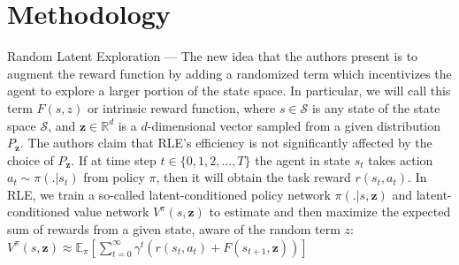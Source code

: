 \documentclass[10pt]{article} %
\begin{document}
\section{Methodology}
Random Latent Exploration --- The new idea that the authors \cite{rle-paper} present is to augment the reward function by adding a randomized term which incentivizes the agent to explore a larger portion of the state space. In particular, we will call this term $F(s, z)$ or intrinsic reward function, where $s \in \mathcal{S}$ is any state of the state space $\mathcal{S}$, and $\textbf{z} \in \mathbb{R}^{d}$ is a $d$-dimensional vector sampled from a given distribution $P_{\textbf{z}}$. The authors \cite{rle-paper} claim that RLE's efficiency is not significantly affected by the choice of $P_{\textbf{z}}$. If at time step $t \in \{0, 1, 2, ..., T\}$ the agent in state $s_{t}$ takes action $a_{t} \sim \pi(. | s_{t})$ from policy $\pi$, then it will obtain the task reward $r (s_{t}, a_{t})$. In RLE, we train a so-called latent-conditioned policy network $\pi(. | s, \textbf{z})$ and latent-conditioned value network $V^{\pi}(s, \textbf{z})$ to estimate and then maximize the expected sum of rewards from a given state, aware of the random term $z$: $V^{\pi}(s, \textbf{z}) \approx \mathbb{E}_{\pi} \left[\sum_{t = 0}^{\infty} \gamma^{t} \left(r(s_{t}, a_{t}) + F(s_{t+1}, \textbf{z})\right) \right]$
\end{document}
